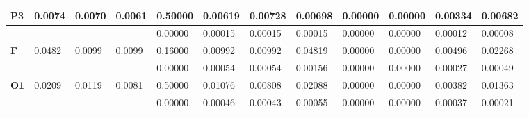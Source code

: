 \documentclass[]{scrartcl}
\begin{document}
\begin{table}[]
\begin{tabular}{|l|l|l|l|l|l|l|l|l|l|l|l|}
		\textbf{P3}                         & 0.0074                          & 0.0070                          & 0.0061                          & 0.50000                           & 0.00619                           & 0.00728                           & 0.00698                           & 0.00000                           & 0.00000                           & 0.00334                           & 0.00682                           \\ \hline
		\textbf{}                           &                                 &                                 &                                 & 0.00000                           & 0.00015                           & 0.00015                           & 0.00015                           & 0.00000                           & 0.00000                           & 0.00012                           & 0.00008                           \\ \hline
		\textbf{F}                          & 0.0482                          & 0.0099                          & 0.0099                          & 0.16000                           & 0.00992                           & 0.00992                           & 0.04819                           & 0.00000                           & 0.00000                           & 0.00496                           & 0.02268                           \\ \hline
		\textbf{}                           &                                 &                                 &                                 & 0.00000                           & 0.00054                           & 0.00054                           & 0.00156                           & 0.00000                           & 0.00000                           & 0.00027                           & 0.00049                           \\ \hline
		\textbf{O1}                         & 0.0209                          & 0.0119                          & 0.0081                          & 0.50000                           & 0.01076                           & 0.00808                           & 0.02088                           & 0.00000                           & 0.00000                           & 0.00382                           & 0.01363                           \\ \hline
		&                                 &                                 &                                 & 0.00000                           & 0.00046                           & 0.00043                           & 0.00055                           & 0.00000                           & 0.00000                           & 0.00037                           & 0.00021                           \\ \hline

\end{tabular}
\end{table}
\end{document}
